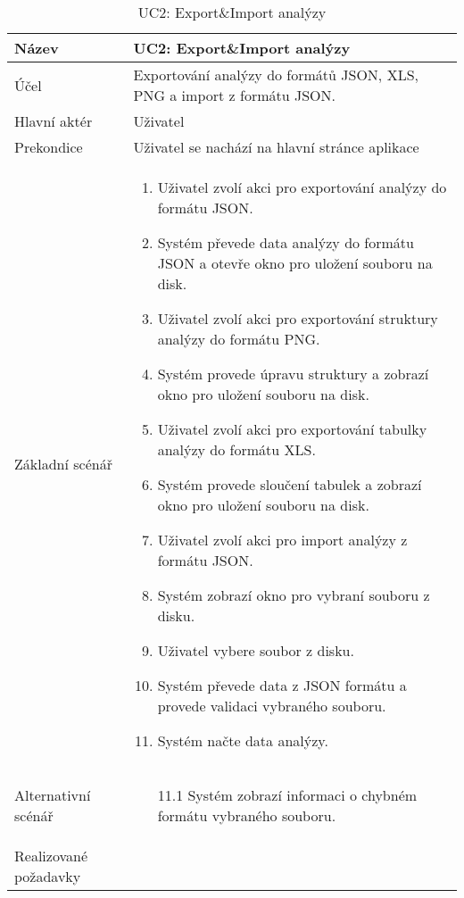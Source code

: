 \begin{table}[h]
	\caption{UC2: Export\&Import analýzy}
	\label{tab:uc2}
\begin{tabular}{p{4cm} | p{12cm} }
Název & UC2: Export\&Import analýzy \\ \hline
Účel &   Exportování analýzy do formátů JSON, XLS, PNG a import z formátu JSON. \\\hline
Hlavní aktér  & Uživatel  \\ \hline
Prekondice & Uživatel se nachází na hlavní stránce aplikace \\ \hline

        Základní scénář &  \begin{enumerate}
     \item Uživatel zvolí akci pro exportování analýzy do formátu JSON.
     \item Systém převede data analýzy do formátu JSON a otevře okno pro uložení souboru na disk.
     \item Uživatel zvolí akci pro exportování struktury analýzy do formátu PNG.
     \item Systém provede úpravu struktury a zobrazí okno pro uložení souboru na disk. 
     \item Uživatel zvolí akci pro exportování tabulky analýzy do formátu XLS.
     \item Systém provede sloučení tabulek a zobrazí okno pro uložení souboru na disk. 
     \item Uživatel zvolí akci pro import analýzy z formátu JSON.
     \item Systém zobrazí okno pro vybraní souboru z disku. 
     \item Uživatel vybere soubor z disku. 
     \item Systém převede data z JSON formátu a provede validaci vybraného souboru. 
     \item Systém načte data analýzy.
     
     
\end{enumerate}\\ \hline
Alternativní scénář  &  
\begin{itemize}
    \item [11.1] Systém zobrazí informaci o chybném formátu vybraného souboru. 
\end{itemize}
\\ \hline
Realizované požadavky\\ \hline
\end{tabular}\  
\end{table}